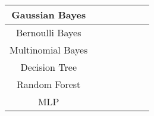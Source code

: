 \begin{table}[]
\begin{tabular}{|c|c|c|c|c|c|c|}
Gaussian Bayes         &                                                             &                                                           &                                                           &                                                           &                                                           &                                                           \\ \hline
Bernoulli Bayes        &                                                             &                                                           &                                                           &                                                           &                                                           &                                                           \\ \hline
Multinomial Bayes      &                                                             &                                                           &                                                           &                                                           &                                                           &                                                           \\ \hline
Decision Tree          &                                                             &                                                           &                                                           &                                                           &                                                           &                                                           \\ \hline
Random Forest          &                                                             &                                                           &                                                           &                                                           &                                                           &                                                           \\ \hline
MLP                    &                                                             &                                                           &                                                           &                                                           &                                                           &                                                           \\ \hline

\end{tabular}
\end{table}

